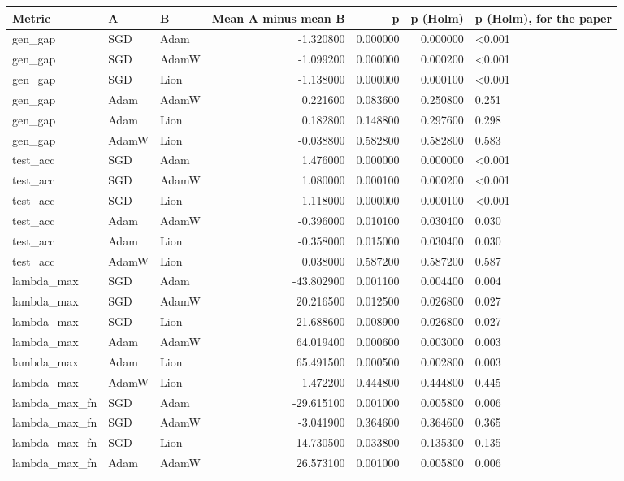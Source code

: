 \begin{tabular}{lllrrrl}
\toprule
Metric & A & B & Mean A minus mean B & p & p (Holm) & p (Holm), for the paper \\
\midrule
gen\_gap & SGD & Adam & -1.320800 & 0.000000 & 0.000000 & <0.001 \\
gen\_gap & SGD & AdamW & -1.099200 & 0.000000 & 0.000200 & <0.001 \\
gen\_gap & SGD & Lion & -1.138000 & 0.000000 & 0.000100 & <0.001 \\
gen\_gap & Adam & AdamW & 0.221600 & 0.083600 & 0.250800 & 0.251 \\
gen\_gap & Adam & Lion & 0.182800 & 0.148800 & 0.297600 & 0.298 \\
gen\_gap & AdamW & Lion & -0.038800 & 0.582800 & 0.582800 & 0.583 \\
test\_acc & SGD & Adam & 1.476000 & 0.000000 & 0.000000 & <0.001 \\
test\_acc & SGD & AdamW & 1.080000 & 0.000100 & 0.000200 & <0.001 \\
test\_acc & SGD & Lion & 1.118000 & 0.000000 & 0.000100 & <0.001 \\
test\_acc & Adam & AdamW & -0.396000 & 0.010100 & 0.030400 & 0.030 \\
test\_acc & Adam & Lion & -0.358000 & 0.015000 & 0.030400 & 0.030 \\
test\_acc & AdamW & Lion & 0.038000 & 0.587200 & 0.587200 & 0.587 \\
lambda\_max & SGD & Adam & -43.802900 & 0.001100 & 0.004400 & 0.004 \\
lambda\_max & SGD & AdamW & 20.216500 & 0.012500 & 0.026800 & 0.027 \\
lambda\_max & SGD & Lion & 21.688600 & 0.008900 & 0.026800 & 0.027 \\
lambda\_max & Adam & AdamW & 64.019400 & 0.000600 & 0.003000 & 0.003 \\
lambda\_max & Adam & Lion & 65.491500 & 0.000500 & 0.002800 & 0.003 \\
lambda\_max & AdamW & Lion & 1.472200 & 0.444800 & 0.444800 & 0.445 \\
lambda\_max\_fn & SGD & Adam & -29.615100 & 0.001000 & 0.005800 & 0.006 \\
lambda\_max\_fn & SGD & AdamW & -3.041900 & 0.364600 & 0.364600 & 0.365 \\
lambda\_max\_fn & SGD & Lion & -14.730500 & 0.033800 & 0.135300 & 0.135 \\
lambda\_max\_fn & Adam & AdamW & 26.573100 & 0.001000 & 0.005800 & 0.006 \\

\end{tabular}
